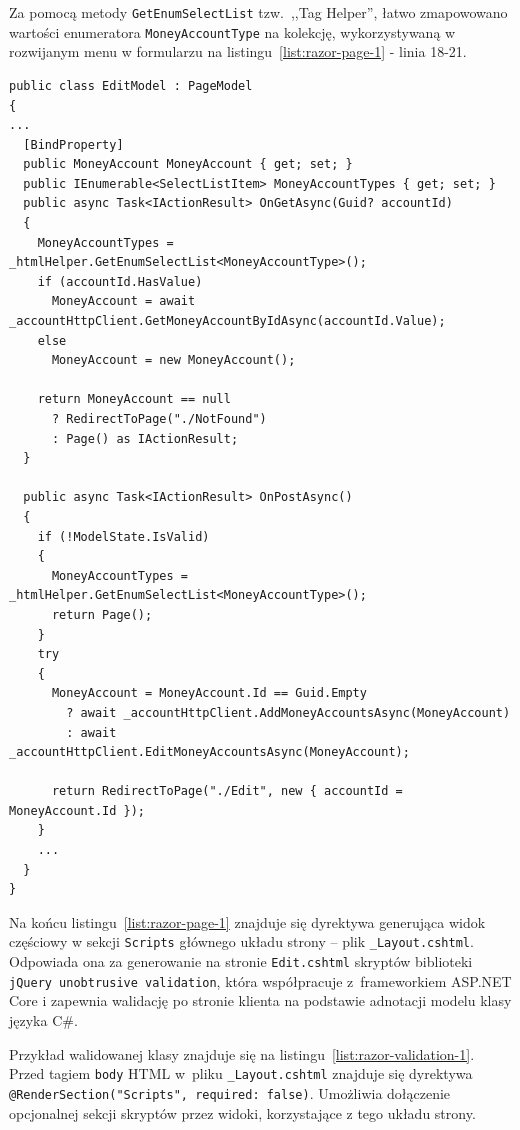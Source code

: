 Za pomocą metody \texttt{GetEnumSelectList} tzw.\ ,,Tag Helper'', łatwo zmapowowano wartości enumeratora \texttt{MoneyAccountType} na kolekcję, wykorzystywaną w rozwijanym menu w formularzu na listingu~\ref{list:razor-page-1} - linia 18-21.

{\belowcaptionskip=-10pt
\begin{lstlisting}[label=list:razor-page-model-1,
    caption=Przykład modelu strony Razor Page: \texttt{EditPage.cs}]
public class EditModel : PageModel
{
...
  [BindProperty]
  public MoneyAccount MoneyAccount { get; set; }
  public IEnumerable<SelectListItem> MoneyAccountTypes { get; set; }
  public async Task<IActionResult> OnGetAsync(Guid? accountId)
  {
    MoneyAccountTypes = _htmlHelper.GetEnumSelectList<MoneyAccountType>();
    if (accountId.HasValue)
      MoneyAccount = await _accountHttpClient.GetMoneyAccountByIdAsync(accountId.Value);
    else
      MoneyAccount = new MoneyAccount();
    
    return MoneyAccount == null 
      ? RedirectToPage("./NotFound")
      : Page() as IActionResult;
  }

  public async Task<IActionResult> OnPostAsync()
  {
    if (!ModelState.IsValid)
    {
      MoneyAccountTypes = _htmlHelper.GetEnumSelectList<MoneyAccountType>();
      return Page();
    }
    try
    {
      MoneyAccount = MoneyAccount.Id == Guid.Empty 
        ? await _accountHttpClient.AddMoneyAccountsAsync(MoneyAccount)
        : await _accountHttpClient.EditMoneyAccountsAsync(MoneyAccount);

      return RedirectToPage("./Edit", new { accountId = MoneyAccount.Id });
    }
    ...
  }
}
\end{lstlisting}
}

Na końcu listingu~\ref{list:razor-page-1} znajduje się dyrektywa generująca widok częściowy w sekcji \texttt{Scripts} głównego układu strony -- plik \texttt{\_Layout.cshtml}. Odpowiada ona za generowanie na stronie \texttt{Edit.cshtml} skryptów biblioteki \texttt{jQuery unobtrusive validation}, która współpracuje z~frameworkiem ASP.NET Core i zapewnia walidację po stronie klienta na podstawie adnotacji modelu klasy języka C\#. 

Przykład walidowanej klasy znajduje się na listingu~\ref{list:razor-validation-1}. Przed tagiem \texttt{body} HTML w~pliku \texttt{\_Layout.cshtml} znajduje się dyrektywa \texttt{@RenderSection("{}Scripts", required: false)}. Umożliwia dołączenie opcjonalnej sekcji skryptów przez widoki, korzystające z tego układu strony.


